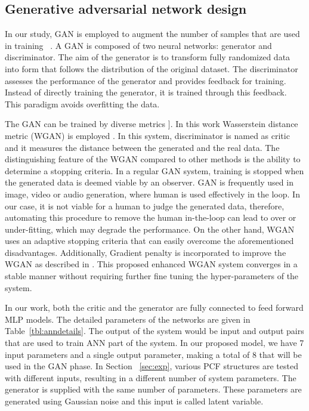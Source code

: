 \documentclass[journal]{IEEEtran}
\begin{document}
\subsection{Generative adversarial network design}
\label{ssec:gan}
In our study, GAN is employed to augment the number of samples that are used in training  \cite{goodfellow2014generative}. A GAN is composed of two neural networks: generator and discriminator. The aim of the generator is to transform fully randomized data into form that follows the distribution of the original dataset. The discriminator assesses the performance of the generator and provides feedback for training. Instead of directly training the generator, it is trained through this feedback. This paradigm avoids overfitting the data.

The GAN can be trained by diverse metrics \cite{goodfellow2014generative, mao2017least, lucic2018gans}]. In this work Wasserstein distance metric (WGAN) is employed \cite{arjovsky2017wasserstein}. In this system, discriminator is named as critic and it measures the distance between the generated and the real data. The distinguishing feature of the WGAN compared to other methods is the ability to determine a stopping criteria. In a regular GAN system, training is stopped when the generated data is deemed viable by an observer. GAN is frequently used in image, video or audio generation, where human is used effectively in the loop. In our case, it is not viable for a human to judge the generated data, therefore, automating this procedure to remove the human in-the-loop can lead to over or under-fitting, which may degrade the performance. On the other hand, WGAN uses an adaptive stopping criteria that can easily overcome the aforementioned disadvantages. Additionally, Gradient penalty is incorporated to improve the WGAN as described in \cite{gulrajani2017improved}. This proposed enhanced WGAN system converges in a stable manner without requiring further fine tuning the hyper-parameters of the system. %

In our work, both the critic and the generator are fully connected to feed forward MLP models. The detailed parameters of the networks are given in Table \ref{tbl:anndetails}. The output of the system would be input and output pairs that are used to train ANN part of the system. In our proposed model, we have 7 input parameters and a single output parameter, making a total of 8 that will be used in the GAN phase. In Section  \ref{sec:exp}, various PCF structures are tested with different inputs, resulting in a different number of system parameters. The generator is supplied with the same number of parameters. These parameters are generated using Gaussian noise and this input is called latent variable.
\end{document}
